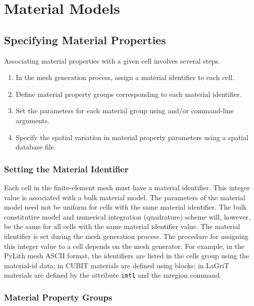 \chapter{Material Models}
\label{cha:material:models}


\section{Specifying Material Properties}

Associating material properties with a given cell involves several
steps. 
\begin{enumerate}
\item In the mesh generation process, assign a material identifier to each
cell.
\item Define material property groups corresponding to each material identifier.
\item Set the parameters for each material group using  and/or command-line arguments.
\item Specify the spatial variation in material property parameters using
a spatial database file.
\end{enumerate}

\subsection{Setting the Material Identifier}

Each cell in the finite-element mesh must have a material identifier.
This integer value is associated with a bulk material model. The parameters
of the material model need not be uniform for cells with the same
material identifier. The bulk constitutive model and numerical integration
(quadrature) scheme will, however, be the same for all cells with
the same material identifier value. The material identifier is set
during the mesh generation process. The procedure for assigning this
integer value to a cell depends on the mesh generator. For example,
in the PyLith mesh ASCII format, the identifiers are listed in the
cells group using the material-id data; in CUBIT materials are defined
using blocks; in LaGriT materials are defined by the attribute \texttt{imt1}
and the mregion command.


\subsection{Material Property Groups}

